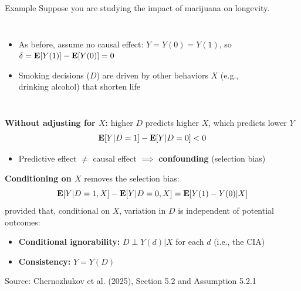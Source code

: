 \documentclass[compress, 8pt]{beamer}
\begin{document}
\begin{frame}{Example}
    Suppose you are studying the impact of marijuana on longevity.

\begin{columns}
\begin{itemize}
    \item As before, assume no causal effect: $Y = Y(0) = Y(1)$, so $\delta = \mathbf{E} [Y(1)] - \mathbf{E} [Y(0)] = 0$
    \item Smoking decisions ($D$) are driven by other behaviors $X$ (e.g., drinking alcohol) that shorten life
\end{itemize}

\begin{figure}
\end{figure}
\end{columns}

\pause
\vspace{2ex}
\textbf{Without adjusting for $X$:} higher $D$ predicts higher $X$, which predicts lower $Y$
\begin{equation*}
    \mathbf{E} [Y \vert D = 1] - \mathbf{E} [Y \vert D = 0] < 0
\end{equation*}
\begin{itemize}
    \item Predictive effect $\neq$ causal effect $\implies$ \textbf{confounding} (selection bias)
\end{itemize}

\pause
\vspace{2ex}
\textbf{Conditioning on $X$} removes the selection bias:
\begin{equation*}
    \mathbf{E} [Y \vert D = 1, X] - \mathbf{E} [Y \vert D = 0, X]  = \mathbf{E} [Y(1) - Y(0) \vert X]
\end{equation*}
provided that, conditional on $X$, variation in $D$ is independent of potential outcomes:
\begin{itemize}
    \item \textbf{Conditional ignorability:} $D \perp Y(d) \vert X$ for each $d$ \quad (i.e., the CIA)
    \item \textbf{Consistency:} $Y = Y(D)$
\end{itemize}

\vspace{2ex}
{\footnotesize Source: Chernozhukov et al. (2025), Section 5.2 and Assumption 5.2.1}
\end{frame}
\end{document}
